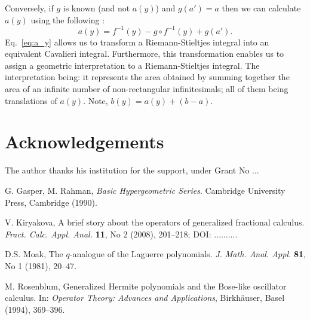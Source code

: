 \documentclass[twoside,reqno,11pt]{fcaa-var} %
\begin{document}
\noindent
Conversely, if $g$ is known (and not $a(y)$) and $g(a') = a$ then we can calculate $a(y)$ using the following \cite{grobler19}:
\begin{equation}
\label{eq:a_y}
a(y) = f^{-1}(y) - g\circ f^{-1}(y) + g(a'). 
\end{equation}
Eq.~\eqref{eq:a_y} allows us to transform a Riemann-Stieltjes integral into an equivalent Cavalieri integral. 
Furthermore, this transformation enables us to assign a geometric interpretation to a Riemann-Stieltjes integral. The interpretation being:
it represents the area obtained by summing together the area of an infinite number of non-rectangular infinitesimals; all of them being translations of $a(y)$. Note,
$b(y) = a(y) + (b-a)$.

 
 
 
 
 
 
 
\section*{Acknowledgements}

 The author thanks his institution for the support, under Grant No ...


 \begin{thebibliography}{99}
 \normalsize


 G. Gasper, M. Rahman,
 \emph{Basic Hypergeometric Series}.
 Cambridge University Press, Cambridge (1990).


 V. Kiryakova,
 A brief story about the operators of generalized
fractional calculus.
 \emph{Fract. Calc. Appl. Anal.} \textbf{11}, No 2 (2008), 201--218; DOI: ..........


 D.S. Moak,
 The $q$-analogue of the Laguerre polynomials.
\emph{J. Math. Anal. Appl.} \textbf{81}, No 1 (1981), 20--47. %


 M. Rosenblum,
 Generalized Hermite polynomials and the Bose-like oscillator
 calculus.
 In: \emph{Operator Theory: Advances and Applications},
 Birkh\"auser, Basel (1994), 369--396.

\end{thebibliography} %
\end{document}
